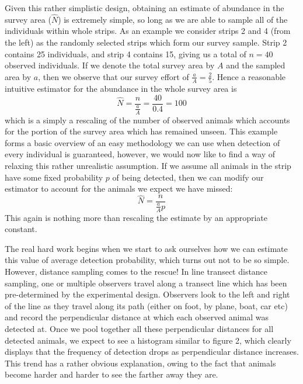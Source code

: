\documentclass[11pt]{article}
\begin{document}
\begin{multicols}{2}
Given this rather simplistic design, obtaining an estimate of abundance in the survey area ($\hat{N}$) is extremely simple, so long as we are able to sample all of the individuals within whole strips. As an example we consider strips 2 and 4 (from the left) as the randomly selected strips which form our survey sample. Strip 2 contains 25 individuals, and strip 4 contains 15, giving us a total of $n=40$ observed individuals. If we denote the total survey area by $A$ and the sampled area by $a$, then we observe that our survey effort of $\frac{a}{A}=\frac{2}{5}$. Hence a reasonable intuitive estimator for the abundance in the whole survey area is
\begin{equation}
\hat{N}=\frac{n}{\frac{a}{A}}=\frac{40}{0.4}=100
\end{equation}
which is a simply a rescaling of the number of observed animals which accounts for the portion of the survey area which has remained unseen. This example forms a basic overview of an easy methodology we can use when detection of every individual is guaranteed, however, we would now like to find a way of relaxing this rather unrealistic assumption. If we assume all animals in the strip have some fixed probability $p$ of being detected, then we can modify our estimator to account for the animals we expect we have missed:
\begin{equation}
\hat{N}=\frac{n}{\frac{a}{A}p}
\end{equation} 
This again is nothing more than rescaling the estimate by an appropriate constant. 

The real hard work begins when we start to ask ourselves how we can estimate this value of average detection probability, which turns out not to be so simple. However, distance sampling comes to the rescue!  In line transect distance sampling, one or multiple observers travel along a transect line which has been pre-determined by the experimental design. Observers look to the left and right of the line as they travel along its path (either on foot, by plane, boat, car etc) and record the perpendicular distance at which each observed animal was detected at. Once we pool together all these perpendicular distances for all detected animals, we expect to see a histogram similar to figure 2, which clearly displays that the frequency of detection drops as perpendicular distance increases. This trend has a rather obvious explanation, owing to the fact that animals become harder and harder to see the farther away they are.


\end{multicols}
\end{document}
